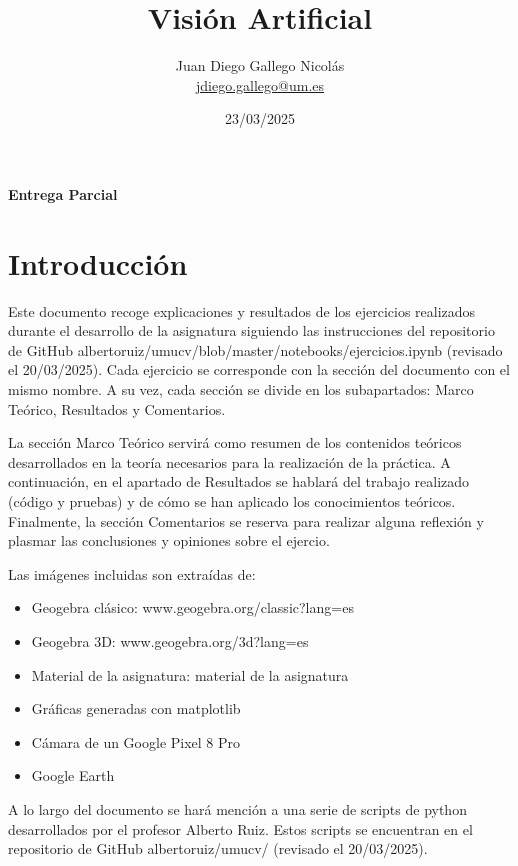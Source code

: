 \documentclass[12pt]{article}
\title{\Huge Visión Artificial}
\author{\Large Juan Diego Gallego Nicolás\\ \href{mailto:jdiego.gallego@um.es}{jdiego.gallego@um.es}}
\date{\Large 23/03/2025}
\begin{document}
\maketitle
\thispagestyle{empty}

\begin{center}
    \vspace{2cm}
    \textbf{Entrega Parcial}
\end{center}

\newpage

\tableofcontents
\newpage

\listoffigures
\newpage

\section{Introducción}
Este documento recoge explicaciones y resultados de los ejercicios realizados durante el desarrollo de la asignatura
siguiendo las instrucciones del repositorio de GitHub albertoruiz/umucv/blob/master/notebooks/ejercicios.ipynb (revisado el 20/03/2025).
Cada ejercicio se corresponde con la sección del documento con el mismo nombre.
A su vez, cada sección se divide en los subapartados: Marco Teórico, Resultados y Comentarios.

La sección Marco Teórico servirá como resumen de los contenidos teóricos desarrollados en la teoría necesarios para la realización de la práctica. 
A continuación, en el apartado de Resultados se hablará del trabajo realizado (código y pruebas) y de cómo se han aplicado los conocimientos teóricos.
Finalmente, la sección Comentarios se reserva para realizar alguna reflexión y plasmar las conclusiones y opiniones sobre el ejercio.

Las imágenes incluidas son extraídas de:
\begin{itemize}
    \item Geogebra clásico: www.geogebra.org/classic?lang=es
    \item Geogebra 3D: www.geogebra.org/3d?lang=es
    \item Material de la asignatura: material de la asignatura
    \item Gráficas generadas con matplotlib
    \item Cámara de un Google Pixel 8 Pro
    \item Google Earth
\end{itemize}

A lo largo del documento se hará mención a una serie de scripts de python desarrollados por el profesor Alberto Ruiz. Estos scripts se encuentran en el repositorio de GitHub albertoruiz/umucv/ (revisado el 20/03/2025).
\end{document}
